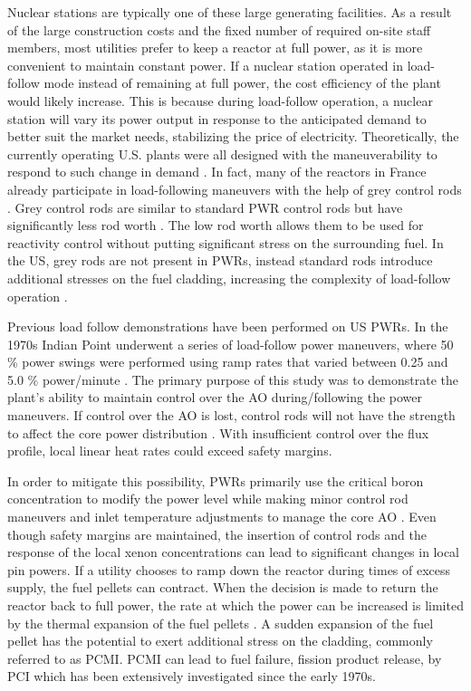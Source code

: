 \documentclass[edeposit,fullpage,11pt]{uiucthesis2009}
\begin{document}
Nuclear stations are typically one of these large generating facilities.
As a result of the large construction costs and the fixed number of required on-site staff members, most utilities prefer to keep a reactor at full power, as it is more convenient  to maintain constant power. 
If a nuclear station operated in load-follow mode instead of remaining at full power, the cost efficiency of the plant would likely increase.
This is because during load-follow operation, a nuclear station will vary its power output in response to the anticipated demand to better suit the market needs, stabilizing the price of electricity.
Theoretically, the currently operating U.S. plants were all designed with the maneuverability to respond to such change in demand \cite{lokhov_technical_2011}.
In fact, many of the reactors in France already participate in load-following maneuvers with the help of grey control rods \cite{lokhov_technical_2011}.
Grey control rods are similar to standard \gls{PWR} control rods but have significantly less rod worth \cite{yousefpour_improvement_2000}.
The low rod worth allows them to be used for reactivity control without putting significant stress on the surrounding fuel. 
In the \gls{US}, grey rods are not present in \gls{PWR}s, instead standard rods introduce additional stresses on the fuel cladding, increasing the complexity of load-follow operation \cite{lokhov_technical_2011}.
  
Previous load follow demonstrations have been performed on \gls{US} \gls{PWR}s.
In the 1970s Indian Point underwent a series of load-follow power maneuvers, where 50 \% power swings were performed using ramp rates that varied between 0.25 and 5.0 \% power/minute \cite{sipush_load-follow_1976}.
The primary purpose of this study was to demonstrate the plant's ability to maintain control over the \gls{AO} during/following the power maneuvers. 
If control over the \gls{AO} is lost, control rods will not have the strength to affect the core power distribution  \cite{sipush_load-follow_1976}.
With insufficient control over the flux profile, local linear heat rates could exceed safety margins.

In order to mitigate this possibility, \gls{PWR}s primarily use the critical boron concentration to modify the power level while making minor control rod maneuvers and inlet temperature adjustments to manage the core \gls{AO} \cite{meyer_improved_1978}.  
Even though safety margins are maintained, the insertion of control rods and the response of the local xenon concentrations can lead to significant changes in local pin powers.
If a utility chooses to ramp down the reactor during times of excess supply, the fuel pellets can contract.
When the decision is made to return the reactor back to full power, the rate at which the power can be increased is limited by the thermal expansion of the fuel pellets \cite{gartner_power_1984}.
A sudden expansion of the fuel pellet has the potential to exert additional stress on the cladding, commonly referred to as \gls{PCMI}.
\gls{PCMI} can lead to fuel failure, fission product release, by \gls{PCI} which has been extensively investigated since the early 1970s.
\end{document}
